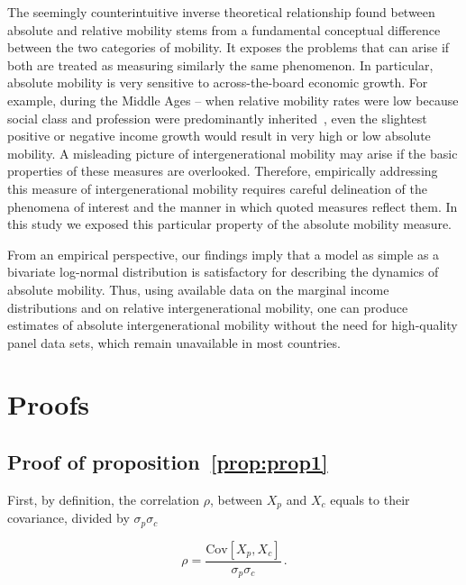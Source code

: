 \documentclass[12pt]{article}
\newcommand{\preflong}[1]{proposition~\ref{prop:#1}}
\newcommand{\be}{\begin{equation}}
\newcommand{\ee}{\end{equation}}
\numberwithin{equation}{section}
\begin{document}
The seemingly counterintuitive inverse theoretical relationship found between absolute and relative mobility stems from a fundamental conceptual difference between the two categories of mobility. It exposes the problems that can arise if both are treated as measuring similarly the same phenomenon. In particular, absolute mobility is very sensitive to across-the-board economic growth. For example, during the Middle Ages -- when relative mobility rates were low because social class and profession were predominantly inherited~\citep{goldthorpe1982social,clark2014also}, even the slightest positive or negative income growth would result in very high or low absolute mobility. A misleading picture of intergenerational mobility may arise if the basic properties of these measures are overlooked. Therefore, empirically addressing this measure of intergenerational mobility requires careful delineation of the phenomena of interest and the manner in which quoted measures reflect them. In this study we exposed this particular property of the absolute mobility measure.

From an empirical perspective, our findings imply that a model as simple as a bivariate log-normal distribution is satisfactory for describing the dynamics of absolute mobility. Thus, using available data on the marginal income distributions and on relative intergenerational mobility, one can produce estimates of absolute intergenerational mobility without the need for high-quality panel data sets, which remain unavailable in most countries.

\clearpage

\doublespacing


\clearpage


\appendix

\section{Proofs}
\label{app:appA}

\subsection{Proof of \preflong{prop1}}

First, by definition, the correlation $\rho$, between $X_p$ and $X_c$ equals to their covariance, divided by $\sigma_p\sigma_c$

\be
\rho = \frac{\text{Cov}\left[X_p,X_c\right]}{\sigma_p\sigma_c}\,.
\ee
\end{document}
